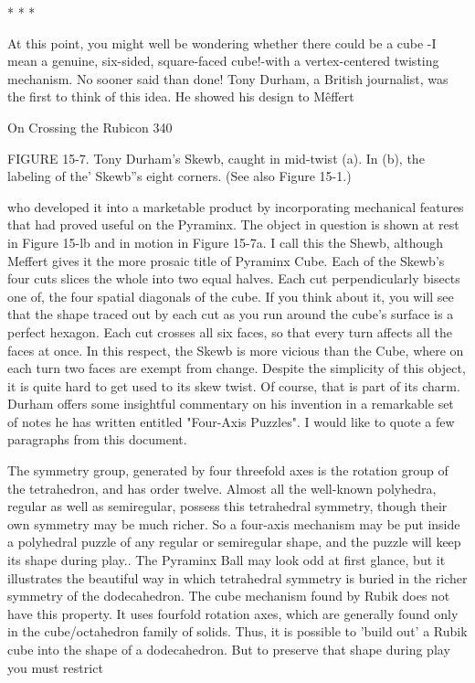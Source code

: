                                        *   *   *

         At this point, you might well be wondering whether there could be a cube -I
mean a genuine, six-sided, square-faced cube!-with a vertex-centered twisting
mechanism. No sooner said than done! Tony Durham, a British journalist, was the
first to think of this idea. He showed his design to Mêffert




On Crossing the Rubicon                                                              340

FIGURE 15-7. Tony Durham's Skewb, caught in mid-twist (a). In (b), the labeling of
the' Skewb''s eight corners. (See also Figure 15-1.)

who developed it into a marketable product by incorporating mechanical features that
had proved useful on the Pyraminx. The object in question is shown at rest in Figure
15-lb and in motion in Figure 15-7a. I call this the Shewb, although Meffert gives it
the more prosaic title of Pyraminx Cube.
        Each of the Skewb's four cuts slices the whole into two equal halves. Each cut
perpendicularly bisects one of, the four spatial diagonals of the cube. If you think
about it, you will see that the shape traced out by each cut as you run around the
cube's surface is a perfect hexagon. Each cut crosses all six faces, so that every turn
affects all the faces at once. In this respect, the Skewb is more vicious than the Cube,
where on each turn two faces are exempt from change. Despite the simplicity of this
object, it is quite hard to get used to its skew twist. Of course, that is part of its charm.
        Durham offers some insightful commentary on his invention in a remarkable
set of notes he has written entitled "Four-Axis Puzzles". I would like to quote a few
paragraphs from this document.

           The symmetry group, generated by four threefold axes is the rotation
   group of the tetrahedron, and has order twelve. Almost all the well-known
   polyhedra, regular as well as semiregular, possess this tetrahedral symmetry,
   though their own symmetry may be much richer. So a four-axis mechanism may
   be put inside a polyhedral puzzle of any regular or semiregular shape, and the
   puzzle will keep its shape during play.. The Pyraminx Ball may look odd at first
   glance, but it illustrates the beautiful way in which tetrahedral symmetry is
   buried in the richer symmetry of the dodecahedron.
           The cube mechanism found by Rubik does not have this property. It uses
   fourfold rotation axes, which are generally found only in the cube/octahedron
   family of solids. Thus, it is possible to 'build out' a Rubik cube into the shape of
   a dodecahedron. But to preserve that shape during play you must restrict




